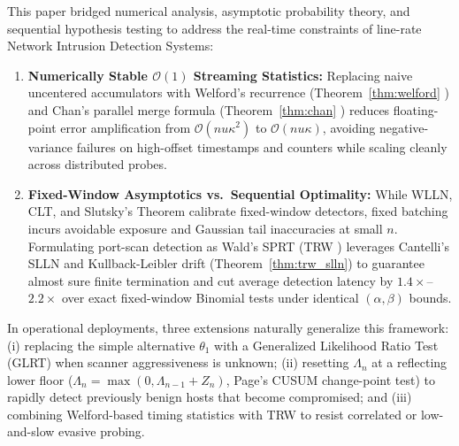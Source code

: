 \documentclass[oneside,noexaminfo,english]{sapthesis}
\numberwithin{equation}{section}
\numberwithin{figure}{section}
\numberwithin{table}{section}
\theoremstyle{compactplain}
\theoremstyle{compactdef}
\theoremstyle{compactrem}
\begin{document}
This paper bridged numerical analysis, asymptotic probability theory, and sequential hypothesis testing to address the real-time constraints of line-rate Network Intrusion Detection Systems:
\begin{enumerate}
    \item \textbf{Numerically Stable $\mathcal{O}(1)$ Streaming Statistics:} Replacing naive uncentered accumulators with Welford's recurrence (Theorem~\ref{thm:welford} \cite{welford1962}) and Chan's parallel merge formula (Theorem~\ref{thm:chan} \cite{chan1983}) reduces floating-point error amplification from $\mathcal{O}(n u \kappa^2)$ to $\mathcal{O}(n u \kappa)$, avoiding negative-variance failures on high-offset timestamps and counters while scaling cleanly across distributed probes.
    \item \textbf{Fixed-Window Asymptotics vs.\ Sequential Optimality:} While WLLN, CLT, and Slutsky's Theorem calibrate fixed-window detectors, fixed batching incurs avoidable exposure and Gaussian tail inaccuracies at small $n$. Formulating port-scan detection as Wald's SPRT (TRW \cite{wald1945,jung2004}) leverages Cantelli's SLLN and Kullback-Leibler drift (Theorem~\ref{thm:trw_slln}) to guarantee almost sure finite termination and cut average detection latency by $1.4\times$--$2.2\times$ over exact fixed-window Binomial tests under identical $(\alpha, \beta)$ bounds.
\end{enumerate}
In operational deployments, three extensions naturally generalize this framework: (i) replacing the simple alternative $\theta_1$ with a Generalized Likelihood Ratio Test (GLRT) when scanner aggressiveness is unknown; (ii) resetting $\Lambda_n$ at a reflecting lower floor ($\Lambda_n = \max(0, \Lambda_{n-1} + Z_n)$, Page's CUSUM change-point test) to rapidly detect previously benign hosts that become compromised; and (iii) combining Welford-based timing statistics with TRW to resist correlated or low-and-slow evasive probing.
\end{document}
